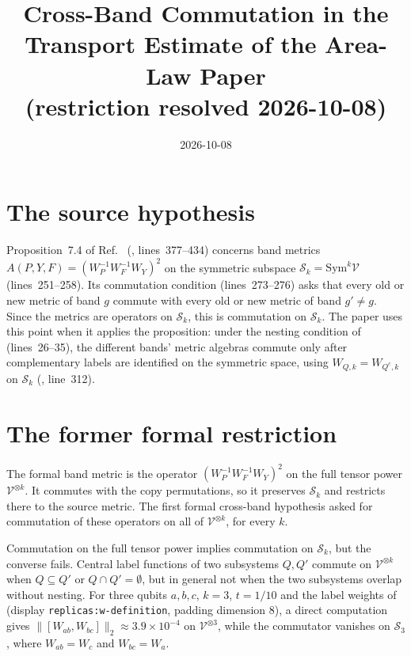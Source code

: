 \documentclass[11pt]{article}
\title{Cross-Band Commutation in the Transport Estimate of the Area-Law Paper\\
{\large (restriction resolved 2026-10-08)}}
\author{}
\date{2026-10-08}
\begin{document}
\maketitle
{}

\section{The source hypothesis}

Proposition~7.4 of Ref.~\cite{OpenAI2026AreaLaw} (,
lines~377--434) concerns band metrics
$A(P,Y,F)=(W_P^{-1}W_F^{-1}W_Y)^2$ on the symmetric subspace
$\mathcal S_k=\mathrm{Sym}^k\mathcal V$ (lines~251--258). Its commutation
condition (lines~273--276) asks that every old or new metric of band $g$
commute with every old or new metric of band $g'\neq g$. Since the metrics
are operators on $\mathcal S_k$, this is commutation on $\mathcal S_k$. The
paper uses this point when it applies the proposition: under the nesting
condition of  (lines~26--35), the different bands'
metric algebras commute only after complementary labels are identified on the
symmetric space, using $W_{Q,k}=W_{Q^c,k}$ on $\mathcal S_k$
(, line~312).

\section{The former formal restriction}

The formal band metric is the operator
$(W_P^{-1}W_F^{-1}W_Y)^2$ on the full tensor power
$\mathcal V^{\otimes k}$. It commutes with the copy permutations, so it
preserves $\mathcal S_k$ and restricts there to the source metric. The first
formal cross-band hypothesis asked for commutation of these operators on all of
$\mathcal V^{\otimes k}$, for every $k$.

Commutation on the full tensor power implies commutation on $\mathcal S_k$,
but the converse fails. Central label functions of two subsystems $Q,Q'$
commute on $\mathcal V^{\otimes k}$ when $Q\subseteq Q'$ or $Q\cap Q'=\emptyset$,
but in general not when the two subsystems overlap without nesting. For three
qubits $a,b,c$, $k=3$, $t=1/10$ and the label weights of
 (display \texttt{replicas:w-definition}, padding
dimension $8$), a direct computation gives
$\|[W_{ab},W_{bc}]\|_2\approx 3.9\times10^{-4}$ on $\mathcal V^{\otimes 3}$,
while the commutator vanishes on $\mathcal S_3$, where
$W_{ab}=W_c$ and $W_{bc}=W_a$.
\end{document}
